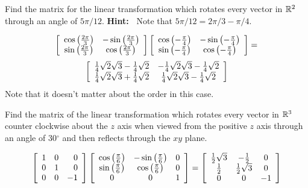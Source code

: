 \begin{enumialphparenastyle}
\begin{ex} Find the matrix for the linear transformation which rotates every
vector in $\mathbb{R}^{2}$ through an angle of $5\pi /12.$ \textbf{Hint:\ }
Note that $5\pi /12=2\pi /3-\pi /4.$
\begin{sol}
\[
\left[
\begin{array}{cc}
\cos \left( \frac{2\pi }{3}\right) & -\sin \left( \frac{2\pi }{3}\right) \\
\sin \left( \frac{2\pi }{3}\right) & \cos \left( \frac{2\pi }{3}\right)
\end{array}
\right] \left[
\begin{array}{cc}
\cos \left( -\frac{\pi }{4}\right) & -\sin \left( -\frac{\pi }{4}\right) \\
\sin \left( -\frac{\pi }{4}\right) & \cos \left( -\frac{\pi }{4}\right)
\end{array}
\right] = 
\]
\[
\left[
\begin{array}{cc}
\frac{1}{4}\sqrt{2}\sqrt{3}-\frac{1}{4}\sqrt{2} & -\frac{1}{4}\sqrt{2}\sqrt{3
}-\frac{1}{4}\sqrt{2} \\
\frac{1}{4}\sqrt{2}\sqrt{3}+\frac{1}{4}\sqrt{2} & \frac{1}{4}\sqrt{2}\sqrt{3}
-\frac{1}{4}\sqrt{2}
\end{array}
\right]
\]
Note that it doesn't matter about the order in this case.
\end{sol}
\end{ex}

\begin{ex} Find the matrix of the linear transformation which rotates every
vector in $\mathbb{R}^{3}$ counter clockwise about the $z$ axis when viewed
from the positive $z$ axis through an angle of 30$^{\circ }$ and then
reflects through the $xy$ plane.
\begin{sol}
\[
\left[
\begin{array}{rrr}
1 & 0 & 0 \\
0 & 1 & 0 \\
0 & 0 & -1
\end{array}
\right] \left[
\begin{array}{ccc}
\cos \left( \frac{\pi }{6}\right)  & -\sin \left( \frac{\pi }{6}\right)  & 0
\\
\sin \left( \frac{\pi }{6}\right)  & \cos \left( \frac{\pi }{6}\right)  & 0
\\
0 & 0 & 1
\end{array}
\right] = \left[
\begin{array}{ccc}
\frac{1}{2}\sqrt{3} & -\frac{1}{2} & 0 \\
\frac{1}{2} & \frac{1}{2}\sqrt{3} & 0 \\
0 & 0 & -1
\end{array}
\right]
\]
\end{sol}
\end{ex}
 

\end{enumialphparenastyle}
